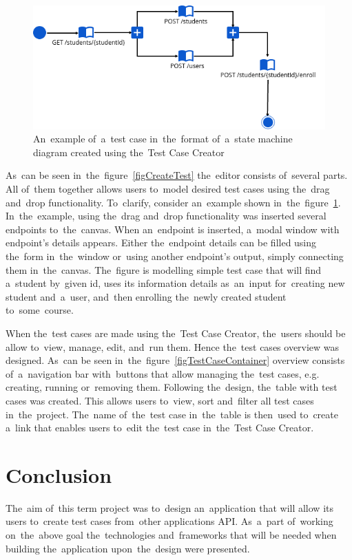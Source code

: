 \begin{figure}[!hbt]
	\centering
	\includegraphics[scale=0.7]{./designs/fsm.png}
	\caption{An~example of~a~test case in~the~format of~a~state machine diagram
	created using the~Test Case Creator}
	\label{figFSM}
\end{figure}

As~can be seen in~the~figure~\ref{figCreateTest} the~editor consists of~several
parts. All of~them together allows users to~model desired test cases using
the~drag and~drop functionality. To~clarify, consider an~example shown
in~the~figure~\ref{figFSM}. In~the~example, using the~drag and~drop
functionality was inserted several endpoints to~the~canvas. When an~endpoint is
inserted, a~modal window with endpoint's details appears. Either the~endpoint
details can be filled using the~form in~the~window or~using another endpoint's
output, simply connecting them in~the~canvas. The~figure is modelling simple test case that
will find a~student by~given id, uses its information details as~an~input 
for~creating new student and~a~user, and~then enrolling the~newly created 
student to~some~course.

When the~test cases are made using the~Test Case Creator, the~users should be
allow to~view, manage, edit, and~run them. Hence the~test cases overview was
designed. As~can be seen in~the~figure~\ref{figTestCaseContainer} overview
consists of~a~navigation bar with~buttons that allow managing the~test cases, e.g.
creating, running or~removing them. Following the~design, the~table with test
cases was created. This allows users to~view, sort and~filter all test cases
in~the~project. The~name of~the~test case in~the~table is then~used to~create
a~link that enables users to~edit the~test case in~the~Test Case Creator.




\chapter{Conclusion}
The~aim of~this term project was to~design an~application that will allow its
users to~create test cases from~other applications API. As~a~part of~working
on~the~above goal the~technologies and~frameworks that will be needed when
building the~application upon~the~design were presented.

